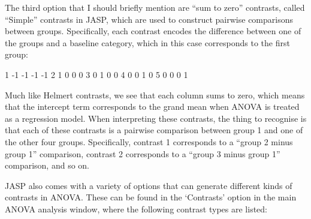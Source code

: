  
The third option that I should briefly mention are ``sum to zero'' contrasts, called ``Simple'' contrasts in JASP, which are used to construct pairwise comparisons between groups. Specifically, each contrast encodes the difference between one of the groups and a baseline category, which in this case corresponds to the first group: 
\begin{rblock1}
1   -1   -1   -1   -1
2    1    0    0    0
3    0    1    0    0
4    0    0    1    0
5    0    0    0    1
\end{rblock1}  
Much like Helmert contrasts, we see that each column sums to zero, which means that the intercept term corresponds to the grand mean when ANOVA is treated as a regression model. When interpreting these contrasts, the thing to recognise is that each of these contrasts is a pairwise comparison between group 1 and one of the other four groups. Specifically, contrast 1 corresponds to a ``group 2 minus group 1'' comparison, contrast 2 corresponds to a ``group 3 minus group 1'' comparison, and so on. 


JASP also comes with a variety of options that can generate different kinds of contrasts in ANOVA. These can be found in the `Contrasts' option in the main ANOVA analysis window, where the following contrast types are listed: 

